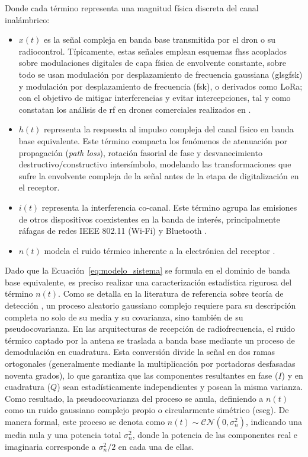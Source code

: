 Donde cada término representa una magnitud física discreta del canal inalámbrico:
\begin{itemize}
    \item $x(t)$ es la señal compleja en banda base transmitida por el dron o su radiocontrol. Típicamente, estas señales emplean esquemas \gls{fhss} acoplados sobre modulaciones digitales de capa física de envolvente constante, sobre todo se usan modulación por desplazamiento de frecuencia gaussiana (gls{gfsk}) y modulación por desplazamiento de frecuencia ({fsk}), o derivados como LoRa; con el objetivo de mitigar interferencias y evitar intercepciones, tal y como constatan los análisis de \gls{rf} en drones comerciales realizados en \cite{ezuma_detection_2020, gluge_robust_2024}.
    \item $h(t)$ representa la respuesta al impulso compleja del canal físico en banda base equivalente. Este término compacta los fenómenos de atenuación por propagación (\textit{path loss}), rotación fasorial de fase y desvanecimiento destructivo/constructivo intersímbolo, modelando las transformaciones que sufre la envolvente compleja de la señal antes de la etapa de digitalización en el receptor.
    \item $i(t)$ representa la interferencia co-canal. Este término agrupa las emisiones de otros dispositivos coexistentes en la banda de interés, principalmente ráfagas de redes IEEE 802.11 (Wi-Fi) y Bluetooth \cite{ezuma_detection_2020}.
    \item $n(t)$ modela el ruido térmico inherente a la electrónica del receptor \cite{lacy_machine_2024}.
\end{itemize}

Dado que la Ecuación~\ref{eq:modelo_sistema} se formula en el dominio de banda base equivalente, es preciso realizar una caracterización estadística rigurosa del término $n(t)$. Como se detalla en la literatura de referencia sobre teoría de detección \cite{kay_fundamentals_1998}, un proceso aleatorio gaussiano complejo requiere para su descripción completa no solo de su media y su covarianza, sino también de su pseudocovarianza. En las arquitecturas de recepción de radiofrecuencia, el ruido térmico captado por la antena se traslada a banda base mediante un proceso de demodulación en cuadratura. Esta conversión divide la señal en dos ramas ortogonales (generalmente mediante la multiplicación por portadoras desfasadas noventa grados), lo que garantiza que las componentes resultantes en fase ($I$) y en cuadratura ($Q$) sean estadísticamente independientes y posean la misma varianza. Como resultado, la pseudocovarianza del proceso se anula, definiendo a $n(t)$ como un ruido gaussiano complejo propio o circularmente simétrico (\gls{cscg}). De manera formal, este proceso se denota como $n(t) \sim \mathcal{CN}(0, \sigma_n^2)$, indicando una media nula y una potencia total $\sigma_n^2$, donde la potencia de las componentes real e imaginaria corresponde a $\sigma_n^2/2$ en cada una de ellas.


